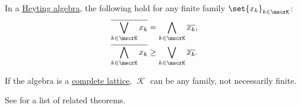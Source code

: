 \begin{theorem}\label{thm:de_morgans_laws_for_heyting_algebras}
  In a \hyperref[def:heyting_algebra]{Heyting algebra}, the following hold for any finite family \( \set{ x_k }_{k \in \mscrK} \):
  \begin{subequations}
    \begin{align}
      \oline{\bigvee_{k \in \mscrK} x_k}   &=    \bigwedge_{k \in \mscrK} \oline{x_k}, \label{eq:thm:de_morgans_laws_for_heyting_algebras/complement_of_join} \\
      \oline{\bigwedge_{k \in \mscrK} x_k} &\geq \bigvee_{k \in \mscrK} \oline{x_k}.   \label{eq:thm:de_morgans_laws_for_heyting_algebras/complement_of_meet}
    \end{align}
  \end{subequations}

  If the algebra is a \hyperref[def:complete_lattice]{complete lattice}, \( \mscrK \) can be any family, not necessarily finite.
\end{theorem}
\begin{comments}
  \item See  for a list of related theorems.
\end{comments}
